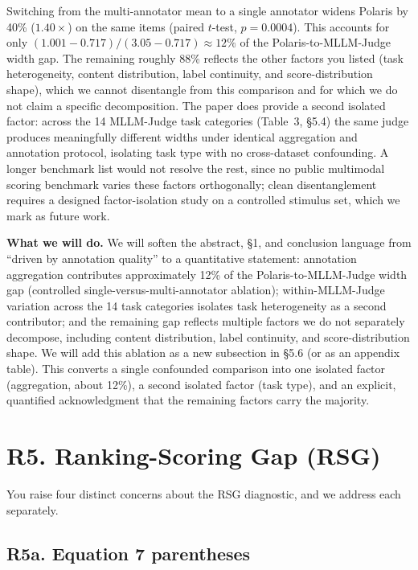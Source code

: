 \documentclass[11pt]{article}
\begin{document}
Switching from the multi-annotator mean to a single annotator widens Polaris by 40\% ($1.40\times$) on the same items (paired $t$-test, $p = 0.0004$). This accounts for only $(1.001 - 0.717)/(3.05 - 0.717) \approx 12\%$ of the Polaris-to-MLLM-Judge width gap. The remaining roughly 88\% reflects the other factors you listed (task heterogeneity, content distribution, label continuity, and score-distribution shape), which we cannot disentangle from this comparison and for which we do not claim a specific decomposition. The paper does provide a second isolated factor: across the 14 MLLM-Judge task categories (Table~3, \S 5.4) the same judge produces meaningfully different widths under identical aggregation and annotation protocol, isolating task type with no cross-dataset confounding. A longer benchmark list would not resolve the rest, since no public multimodal scoring benchmark varies these factors orthogonally; clean disentanglement requires a designed factor-isolation study on a controlled stimulus set, which we mark as future work.

\textbf{What we will do.} We will soften the abstract, \S 1, and conclusion language from ``driven by annotation quality'' to a quantitative statement: annotation aggregation contributes approximately 12\% of the Polaris-to-MLLM-Judge width gap (controlled single-versus-multi-annotator ablation); within-MLLM-Judge variation across the 14 task categories isolates task heterogeneity as a second contributor; and the remaining gap reflects multiple factors we do not separately decompose, including content distribution, label continuity, and score-distribution shape. We will add this ablation as a new subsection in \S 5.6 (or as an appendix table). This converts a single confounded comparison into one isolated factor (aggregation, about 12\%), a second isolated factor (task type), and an explicit, quantified acknowledgment that the remaining factors carry the majority.

\section*{R5. Ranking-Scoring Gap (RSG)}

You raise four distinct concerns about the RSG diagnostic, and we address each separately.

\subsection*{R5a. Equation 7 parentheses}
\end{document}
